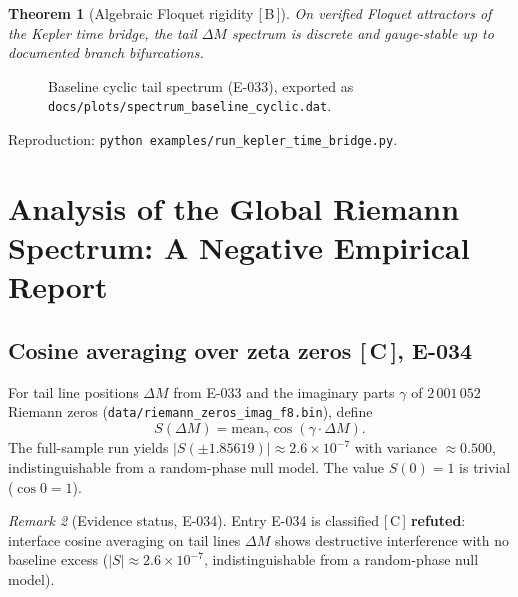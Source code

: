\documentclass[11pt, lettersize, article]{article}
\newtheorem{theorem}{Theorem}
\theoremstyle{definition}
\theoremstyle{remark}
\newtheorem{remark}[theorem]{Remark}
\newcommand{\evidence}[1]{\textnormal{[\,#1\,]}}
\begin{document}
\begin{theorem}[Algebraic Floquet rigidity \evidence{B}]
\label{thm:floquet}
On verified Floquet attractors of the Kepler time bridge, the tail $\Delta M$ spectrum is discrete and gauge-stable up to documented branch bifurcations.
\end{theorem}

\begin{figure}[htbp]
\centering
{}
\caption{Baseline cyclic tail spectrum (E-033), exported as \texttt{docs/plots/spectrum\_baseline\_cyclic.dat}.}
\label{fig:baseline-spectrum}
\end{figure}

Reproduction: \texttt{python examples/run\_kepler\_time\_bridge.py}.

\section{Analysis of the Global Riemann Spectrum: A Negative Empirical Report}
\label{sec:riemann}

\subsection{Cosine averaging over zeta zeros \evidence{C}, E-034}

For tail line positions $\Delta M$ from E-033 and the imaginary parts $\gamma$ of $2\,001\,052$ Riemann zeros (\texttt{data/riemann\_zeros\_imag\_f8.bin}), define
\[
  S(\Delta M) = \mathrm{mean}_\gamma \cos(\gamma \cdot \Delta M).
\]
The full-sample run yields $|S(\pm 1.85619)| \approx 2.6\times 10^{-7}$ with variance $\approx 0.500$, indistinguishable from a random-phase null model.
The value $S(0)=1$ is trivial ($\cos 0 = 1$).

\begin{remark}[Evidence status, E-034]
Entry E-034 is classified \evidence{C} \textbf{refuted}: interface cosine averaging on tail lines $\Delta M$ shows destructive interference with no baseline excess ($|S|\approx 2.6\times 10^{-7}$, indistinguishable from a random-phase null model).
\end{remark}
\end{document}
